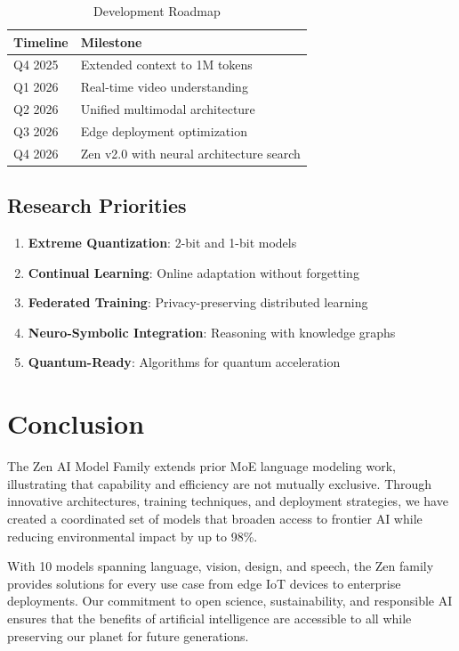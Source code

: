\documentclass[11pt,a4paper]{article}
\begin{document}
\begin{table}[H]
\centering
\begin{tabular}{ll}
\toprule
\textbf{Timeline} & \textbf{Milestone} \\
\midrule
Q4 2025 & Extended context to 1M tokens \\
Q1 2026 & Real-time video understanding \\
Q2 2026 & Unified multimodal architecture \\
Q3 2026 & Edge deployment optimization \\
Q4 2026 & Zen v2.0 with neural architecture search \\
\bottomrule
\end{tabular}
\caption{Development Roadmap}
\end{table}

\subsection{Research Priorities}

\begin{enumerate}
    \item \textbf{Extreme Quantization}: 2-bit and 1-bit models
    \item \textbf{Continual Learning}: Online adaptation without forgetting
    \item \textbf{Federated Training}: Privacy-preserving distributed learning
    \item \textbf{Neuro-Symbolic Integration}: Reasoning with knowledge graphs
    \item \textbf{Quantum-Ready}: Algorithms for quantum acceleration
\end{enumerate}

\section{Conclusion}

The Zen AI Model Family extends prior MoE language modeling work, illustrating that capability and 
efficiency are not mutually exclusive. Through innovative architectures, training techniques, and deployment 
strategies, we have created a coordinated set of models that broaden access to frontier AI while 
reducing environmental impact by up to 98\%.

With 10 models spanning language, vision, design, and speech, the Zen family provides solutions for every use 
case from edge IoT devices to enterprise deployments. Our commitment to open science, sustainability, and 
responsible AI ensures that the benefits of artificial intelligence are accessible to all while preserving 
our planet for future generations.
\end{document}

